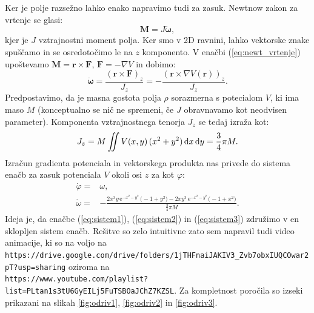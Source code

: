 \documentclass[10pt]{article}
\newcommand{\dd}{\,\mathrm{d}}
\newcommand{\bec}[1]{\mathbf{#1}}
\newcommand{\euler}{\mathrm{e}}
\renewcommand{\iint}{\mathop{\int\mkern-13mu\int}}
\begin{document}
Ker je polje razsežno lahko enako napravimo tudi za zasuk.
Newtnow zakon za vrtenje se glasi:
\begin{equation}
       \bec{M} = J \dot{\bec{\omega}},
       \label{eq:newt_vrtenje}
\end{equation}
kjer je $J$ vztrajnostni moment polja.
Ker smo v 2D ravnini, lahko vektorske znake spuščamo in se osredotočimo le na $z$ komponento.
V enačbi (\ref{eq:newt_vrtenje}) upoštevamo $\bec{M} = \bec{r} \times \bec{F}$,  $\bec{F} = -\nabla V$ in dobimo:
\begin{equation}
       \bec{\dot{\omega}} = \frac{ (\bec{r} \times \bec{F})_z }{J_z} = - \frac{ (\bec{r} \times \nabla V(\bec{r}))_z }{J_z}.
\end{equation}
Predpostavimo, da je masna gostota polja $\rho$ sorazmerna s potecialom $V$, ki ima maso $M$ (konceptualno se nič ne spremeni, če $J$ obravnavamo kot neodvisen parameter).
Komponenta vztrajnostnega tenorja $J_z$ se tedaj izraža kot:
\begin{equation}
       J_z = M \iint  V(x,y)\, (x^2+y^2) \dd x \dd y = \frac{3}{4} \pi M.
\end{equation}
Izračun gradienta potenciala in vektorskega produkta nas privede do sistema enačb za zasuk potenciala $V$ okoli osi $z$ za kot $\varphi$:
\begin{equation}
       \begin{split}
              \dot{\varphi} =& \omega, \\
              \dot{\omega} =& - \frac{2x^3y \, \euler^{-x^2-y^2} \, \bigl(-1+y^2\bigr) - 2xy^3 \, \euler^{-x^2-y^2} \, \bigl(-1+x^2\bigr)}{\frac{3}{4}\pi M}.
       \end{split}
       \label{eq:sistem3}
\end{equation}
Ideja je, da enačbe (\ref{eq:sistem1}), (\ref{eq:sistem2}) in (\ref{eq:sistem3}) združimo v en sklopljen sistem enačb.
Rešitve so zelo intuitivne zato sem napravil tudi video animacije, ki so na voljo na \\
\texttt{https://drive.google.com/drive/folders/1jTHFnaiJAKIV3\_Zvb7obxIUQCOwar2pT?usp=sharing}
  oziroma na \\
 \texttt{https://www.youtube.com/playlist?list=PLtan1s3tU6GyEILj5FuTSBOaJChZ7KZSL}.
Za kompletnost poročila so izseki prikazani na slikah \ref{fig:odriv1}, \ref{fig:odriv2} in \ref{fig:odriv3}.
\end{document}
